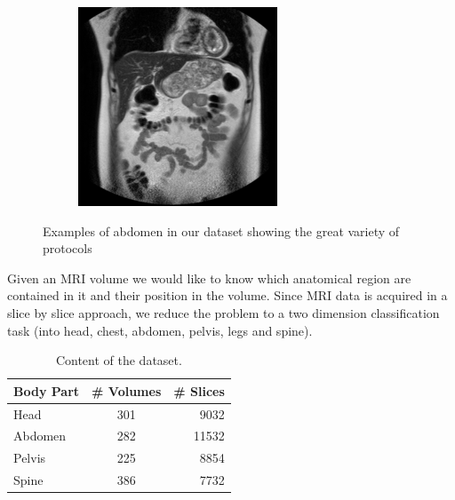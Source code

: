 \begin{figure}
\begin{subfigure}[b]{0.25\textwidth}
        \end{subfigure}%
        \begin{subfigure}[b]{0.25\textwidth}
                \centering
                \includegraphics[width=.95\linewidth]{img_hyperopt/abdo_4}
        \end{subfigure}
        \caption{Examples of abdomen in our dataset showing the great variety of protocols}
        \label{fig:abdomens}
\end{figure}

Given an MRI volume we would like to know which anatomical region are contained in it and their position in the volume. Since MRI data is acquired in a slice by slice approach, we reduce the problem to a two dimension classification task (into head, chest, abdomen, pelvis, legs and spine).

\begin{table}
	\centering
	\begin{tabular}{ | l | c | r | }
		\hline
		Body Part & \# Volumes & \# Slices \\ \hline
		Head & 301 & 9032 \\
		Abdomen & 282 & 11532 \\
		Pelvis & 225 & 8854 \\
		Spine & 386 & 7732 \\
		\hline
	\end{tabular}
	\caption{Content of the dataset.}
	\label{table:dataset}
\end{table}

